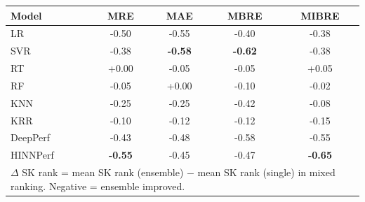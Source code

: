 \begin{tabular}{lcccc}
\toprule
Model & MRE & MAE & MBRE & MIBRE \\
\midrule
LR & -0.50 & -0.55 & -0.40 & -0.38 \\
SVR & -0.38 & \textbf{-0.58} & \textbf{-0.62} & -0.38 \\
RT & +0.00 & -0.05 & -0.05 & +0.05 \\
RF & -0.05 & +0.00 & -0.10 & -0.02 \\
KNN & -0.25 & -0.25 & -0.42 & -0.08 \\
KRR & -0.10 & -0.12 & -0.12 & -0.15 \\
DeepPerf & -0.43 & -0.48 & -0.58 & -0.55 \\
HINNPerf & \textbf{-0.55} & -0.45 & -0.47 & \textbf{-0.65} \\
\bottomrule
\multicolumn{5}{l}{\footnotesize $\Delta$ SK rank = mean SK rank (ensemble) $-$ mean SK rank (single) in mixed ranking. Negative = ensemble improved.} \\
\end{tabular}
